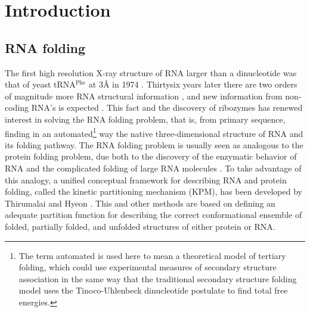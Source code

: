 \chapter{Introduction}
\label{introduction} 

\section{RNA folding}
The first  high resolution X-ray structure  of RNA larger
than a dinucleotide was  that of yeast tRNA$^{\textrm{Phe}}$ at 3{\AA}
in 1974 \cite{robertus1974, kim1974}.  Thirtysix years later there are
two   orders   of    magnitude   more   RNA   structural   information
\cite{noller2005},  and  new  information  from  non-coding  RNA's  is
expected  \cite{weinberg2009}.    This  fact  and   the  discovery  of
ribozymes  \cite{kruger1982,  takada1983}   has  renewed  interest  in
solving  the RNA  folding problem,  that is,  from
primary sequence, finding  in an automated\footnote{The term automated
  is used here to mean  a theoretical model of tertiary folding, which
  could use  experimental measures of  secondary structure association
  in  the same way  that the  traditional secondary  structure folding
  model  \cite{zuker1989,   hofacker1994}  uses  the  Tinoco-Uhlenbeck
  dinucleotide   postulate  \cite{borer1974}   to   find  total   free
  energies.} way the native three-dimensional structure of RNA and its
folding pathway. The RNA folding problem is usually
seen  as analogous to  the protein  folding problem,  due both  to the
discovery   of  the  enzymatic   behavior  of   RNA  \cite{kruger1982,
  takada1983}  and  the complicated  folding  of  large RNA  molecules
\cite{batey1999}.   To  take  advantage  of this  analogy,  a  unified
conceptual framework  for describing  RNA and protein  folding, called
the  kinetic  partitioning  mechanism  (KPM), has  been  developed  by
Thirumalai and Hyeon \cite{thirumalai2005}. This and other methods are
based on  defining an adequate  partition function for  describing the
correct  conformational  ensemble  of  folded, partially  folded,  and
unfolded  structures   \cite{chen1995,  chen1998,  thirumalai1996}  of
either protein or RNA.

